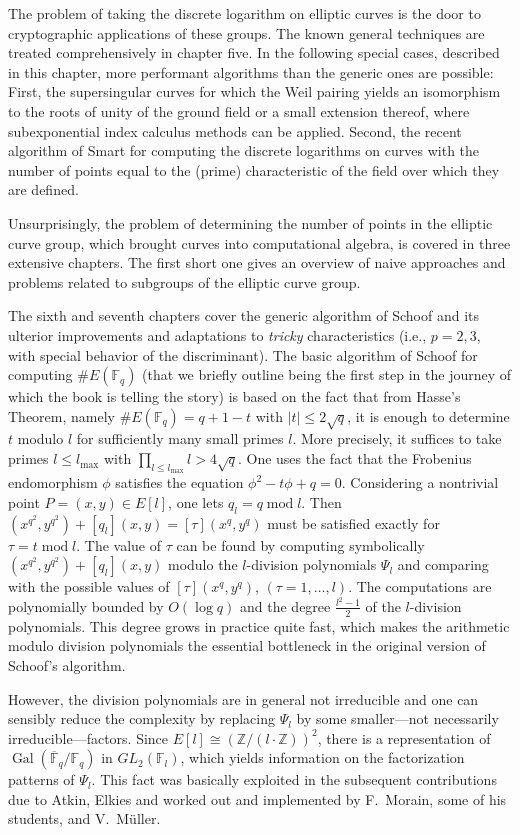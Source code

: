 \documentclass[final]{mcom-l}
\newcommand{\Mod}{\operatorname{mod}}
\newcommand{\Gal}{\operatorname{Gal}}
\begin{document}
The problem of taking the discrete logarithm on elliptic curves is the door to
cryptographic applications of these groups.  The known general techniques are
treated comprehensively in chapter five.  In the following special cases,
described in this chapter, more performant algorithms than the generic ones are
possible: First, the supersingular curves for which the Weil pairing yields an
isomorphism to the roots of unity of the ground field or a small extension
thereof, where subexponential index calculus methods can be applied.  Second,
the recent algorithm of Smart for computing the discrete logarithms on curves
with the number of points equal to the (prime) characteristic of the field over
which they are defined.

 Unsurprisingly, the problem of determining the number of points in the
elliptic curve group, which brought curves into computational algebra, is
covered in three extensive chapters.  The first short one gives an overview of
naive approaches and problems related to subgroups of the elliptic curve group.

The sixth and seventh chapters cover the generic algorithm of Schoof and its
ulterior improvements and adaptations to \emph{tricky} characteristics (i.e.,
$p=2,3$, with special behavior of the discriminant).  The basic algorithm of
Schoof for computing $\#E(\mathbb{F}_q)$ (that we briefly outline being the
first step in the journey of which the book is telling the story) is based on
the fact that from Hasse's Theorem, namely $\#E(\mathbb{F}_q)=q+1-t$ with
$|t|\le 2\sqrt q$, it is enough to determine $t$ modulo $l$ for sufficiently
many small primes $l$.  More precisely, it suffices to take primes $l\le
l_{\max}$ with $\prod_{l\le l_{\max}} l>4\sqrt q$.  One uses the fact that the
Frobenius endomorphism $\phi$ satisfies the equation $\phi^2-t\phi+q=0$.
Considering a nontrivial point $P=(x,y)\in E[l]$, one lets $q_l=q\Mod l$.  Then
$(x^{q^2},y^{q^2})+[q_l](x,y)=[\tau](x^q,y^q)$ must be satisfied exactly for
$\tau=t\Mod l$.  The value of $\tau$ can be found by computing symbolically
$(x^{q^2},y^{q^2})+[q_l](x,y)$ modulo the $l$-division polynomials $\Psi_l$ and
comparing with the possible values of $[\tau](x^q,y^q)$, $(\tau=1,\dotsc,l)$.
The computations are polynomially bounded by $O(\log q)$ and the degree
$\frac{l^2-1}{2}$ of the $l$-division polynomials.  This degree grows in
practice quite fast, which makes the arithmetic modulo division polynomials the
essential bottleneck in the original version of Schoof's algorithm.

However, the division polynomials are in general not irreducible and one can
sensibly reduce the complexity by replacing $\Psi_l$ by some smaller---not
necessarily irreducible---factors.  Since $E[l]\cong (\mathbb{Z}/(l\cdot
\mathbb{Z}))^2$, there is a representation of
$\Gal(\overline{\mathbb{F}}_q/\mathbb{F}_q)$ in $GL_2(\mathbb{F}_l)$, which
yields information on the factorization  patterns of $\Psi_l$.  This fact was
basically exploited in the subsequent contributions due to Atkin, Elkies and
worked out and implemented by F.~Morain, some of his students, and V.~M\"uller.
\end{document}

